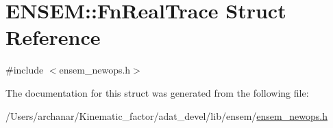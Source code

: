\hypertarget{structENSEM_1_1FnRealTrace}{}\section{E\+N\+S\+EM\+:\+:Fn\+Real\+Trace Struct Reference}
\label{structENSEM_1_1FnRealTrace}


{\ttfamily \#include $<$ensem\+\_\+newops.\+h$>$}



The documentation for this struct was generated from the following file\+:\begin{DoxyCompactItemize}
\item 
/\+Users/archanar/\+Kinematic\+\_\+factor/adat\+\_\+devel/lib/ensem/\mbox{\hyperlink{lib_2ensem_2ensem__newops_8h}{ensem\+\_\+newops.\+h}}\end{DoxyCompactItemize}
